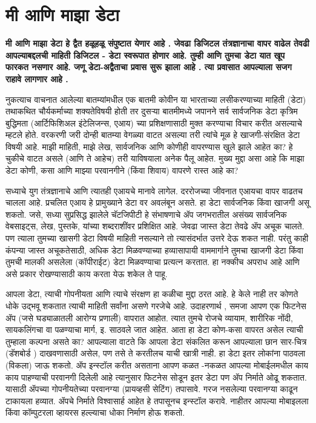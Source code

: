 \chapter{मी आणि माझा डेटा}

{\textbf{मी आणि माझा डेटा हे द्वैत हळूहळू संपुष्टात येणार आहे .  जेवढा डिजिटल तंत्रज्ञानाचा वापर वाढेल तेवढी आपल्याबद्दलची माहिती डिजिटल - डेटा स्वरूपात होणार आहे. तुम्ही आणि तुमचा डेटा  यात खूप फारकत नसणार आहे. जणू डेटा-अद्वैताचा प्रवास सुरू झाला आहे .  त्या प्रवासात आपल्याला सजग राहावे लागणार आहे . }}

\vspace{1.5em}

नुकत्याच वाचनात आलेल्या बातम्यांमधील एक बातमी कोवीन या भारताच्या लसीकरण्याच्या माहिती (डेटा) तथाकथित चौर्यकर्माच्या शक्यतेविषयी होती तर दुसऱ्या बातमीमध्ये जपानने सर्व सार्वजनिक डेटा कृत्रिम बुद्धिमता (आर्टिफिशिअल इंटेलिजन्स, एआय) च्या प्रशिक्षणासाठी मुक्त करण्याचा विचार करीत असल्याचे म्हटले होते. वरकरणी जरी दोन्ही बातम्या वेगळ्या वाटत असल्या तरी त्यांचे मूळ हे खाजगी-संरक्षित डेटा विषयी आहे. माझी माहिती, माझे लेख, सार्वजनिक आणि कोणीही वापरण्यास खुले झाले आहेत का? हे चुकीचे वाटत असले (आणि ते आहेच) तरी याविषयाला अनेक पैलू आहेत. मुख्य मुद्दा असा आहे कि माझा डेटा कोणी, कसा आणि माझ्या परवानगीने (किंवा शिवाय) वापरणे रास्त आहे का?

सध्याचे युग तंत्रज्ञानाचे आणि त्यातही एआयचे मानावे लागेल. दररोजच्या जीवनात एआयचा वापर वाढतच चालला आहे. प्रचलित एआय हे प्रामुख्याने डेटा वर अवलंबून असते. हा डेटा सार्वजनिक किंवा खाजगी असू शकतो. जसे, सध्या सुप्रसिद्ध झालेले चॅटजिपीटी हे संभाषणाचे ॲप जगभरातील असंख्य सार्वजनिक वेबसाइट्स, लेख, पुस्तके, यांच्या शब्दराशींवर प्रशिक्षित आहे. जेवढा जास्त डेटा तेवढे ॲप अचूक चालते. पण त्याला तुमच्या खासगी डेटा विषयी माहिती नसल्याने तो त्यासंदर्भात उत्तरे देऊ शकत नाही. परंतु काही कंपन्या जास्त अचूकतेसाठी, अधिक डेटा मिळवण्याच्या हव्यासापायी वाममार्गाने तुमचा खाजगी डेटा किंवा तुमची मालकी असलेला (कॉपीराईट) डेटा मिळवण्याचा प्रत्यत्न करतात. हा नक्कीच अपराध आहे आणि असे प्रकार रोखण्यासाठी काय करता येऊ शकेल ते पाहू.

आपला डेटा, त्याची गोपनीयता आणि त्याचे संरक्षण हा कळीचा मुद्दा ठरत आहे. हे केले नाही तर कोणते धोके उद्भवू शकतात त्याची माहिती सर्वांना असणे गरजेचे आहे. उदाहरणार्थ , समजा आपण एक फिटनेस ॲप (जसे घड्याळातली आरोग्य प्रणाली) वापरात आहोत. त्यात तुमचे रोजचे व्यायाम, शारीरिक नोंदी, सायकलिंगचा वा पळण्याचा मार्ग, इ. साठवले जात आहेत. आता हा डेटा कोण-कसा वापरत असेल त्याची तुम्हाला कल्पना असते का? आपल्याला वाटते कि आपला डेटा संकलित करून आपल्याला छान सार-चित्र (डॅशबोर्ड ) दाखवणासाठी असेल, पण तसे ते करतीलच याची खात्री नाही. हा डेटा इतर लोकांना पाठवला (विकला) जाऊ शकतो. ॲप इन्स्टॉल करीत असताना आपण कळत -नकळत आपल्या मोबाईलमधील काय काय पाहण्याची परवानगी दिलेली आहे त्यानुसार फिटनेस सोडून इतर डेटा पण ॲप निर्माते ओढू शकतात. यासाठी ॲपच्या गोपनीयतेच्या परवानग्या (प्रायव्हसी सेटिंग) तपासावे. गरज नसलेल्या परवानग्या काढून टाकायला हव्यात. ॲपचे निर्माते विश्वासार्ह आहेत हे तपासूनच इन्स्टॉल करावे. नाहीतर आपल्या मोबाइलला किंवा कॉम्पुटरला व्हायरस हल्ल्याचा धोका निर्माण होऊ शकतो.

